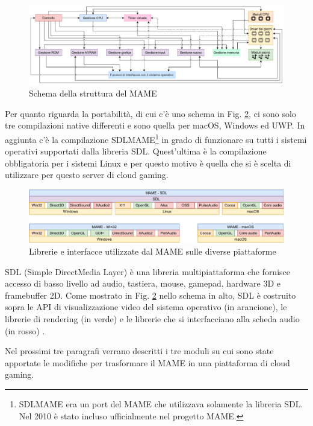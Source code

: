 \begin{figure}[H]
	\includegraphics[width=\linewidth]{immagini/mame_schema_moduli_d}
	\caption{Schema della struttura del MAME}
	\label{fig:mame_schema_moduli_d}
\end{figure}

Per quanto riguarda la portabilità, di cui c'è uno schema in Fig. \ref{fig:mame_architettura_full}, ci sono solo tre compilazioni native differenti e sono quella per macOS, Windows ed UWP. In aggiunta c'è la compilazione SDLMAME\footnote{SDLMAME era un port del MAME che utilizzava solamente la libreria SDL. Nel 2010 è stato incluso ufficialmente nel progetto MAME.} in grado di funzionare su tutti i sistemi operativi supportati dalla libreria SDL. Quest'ultima è la compilazione obbligatoria per i sistemi Linux e per questo motivo è quella che si è scelta di utilizzare per questo server di cloud gaming.

\begin{figure}[H]
	\includegraphics[width=\linewidth]{immagini/mame_architettura_full}
	\caption{Librerie e interfacce utilizzate dal MAME sulle diverse piattaforme}
	\label{fig:mame_architettura_full}
\end{figure}

SDL (Simple DirectMedia Layer) è una libreria multipiattaforma che fornisce accesso di basso livello ad audio, tastiera, mouse, gamepad, hardware 3D e framebuffer 2D. Come mostrato in Fig. \ref{fig:mame_architettura_full} nello schema in alto, SDL è costruito sopra le API di visualizzazione video del sistema operativo (in arancione), le librerie di rendering (in verde) e le librerie che si interfacciano alla scheda audio (in rosso) \parencite{SDL_Wiki}.

Nel prossimi tre paragrafi verrano descritti i tre moduli su cui sono state apportate le modifiche per trasformare il MAME in una piattaforma di cloud gaming.



